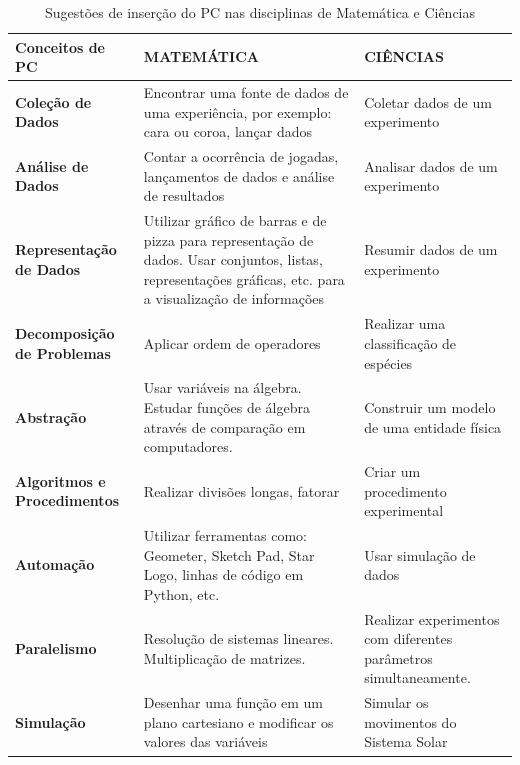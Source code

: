 \documentclass[12pt, openright, a4paper, brazil, openany, oneside]{abntex2}
\begin{document}
\begin{table}[h]
        \centering
        \caption{Sugestões de inserção do PC nas disciplinas de Matemática e Ciências}
                
        \begin{tabular}{ >{\centering\arraybackslash}m{3cm} >{\centering\arraybackslash}m{5.5cm} >{\centering\arraybackslash}m{6cm}}
            \toprule
            \textbf{Conceitos de PC} & \textbf{MATEMÁTICA} & \textbf{CIÊNCIAS} \\
            \midrule
            \textbf{Coleção de Dados} & Encontrar uma fonte de dados de uma experiência, por exemplo: cara ou coroa, lançar dados & Coletar dados de um experimento \\
            \midrule
            \textbf{Análise de Dados} & Contar a ocorrência de jogadas, lançamentos de dados e análise de resultados & Analisar dados de um experimento  \\
            \midrule
            \textbf{Representação de Dados} & Utilizar gráfico de barras e de pizza para representação de dados. Usar conjuntos, listas, representações gráficas, etc. para a visualização de informações & Resumir dados de um experimento \\
            \midrule
            \textbf{Decomposição de Problemas} & Aplicar ordem de operadores & Realizar uma classificação de espécies \\
            \midrule
            \textbf{Abstração} & Usar variáveis na álgebra. Estudar funções de álgebra através de comparação em computadores. & Construir um modelo de uma entidade física \\
            \midrule
            \textbf{Algoritmos e Procedimentos} & Realizar divisões longas, fatorar & Criar um procedimento experimental \\
            \midrule
            \textbf{Automação} & Utilizar ferramentas como: Geometer, Sketch Pad, Star Logo, linhas de código em Python, etc. & Usar simulação de dados \\
            \midrule
            \textbf{Paralelismo} & Resolução de sistemas lineares. Multiplicação de matrizes. & Realizar experimentos com diferentes parâmetros simultaneamente. \\
            \midrule
            \textbf{Simulação} & Desenhar uma função em um plano cartesiano e modificar os valores das variáveis & Simular os movimentos do Sistema Solar \\
            \bottomrule
        \end{tabular}
    \end{table}
\end{document}
